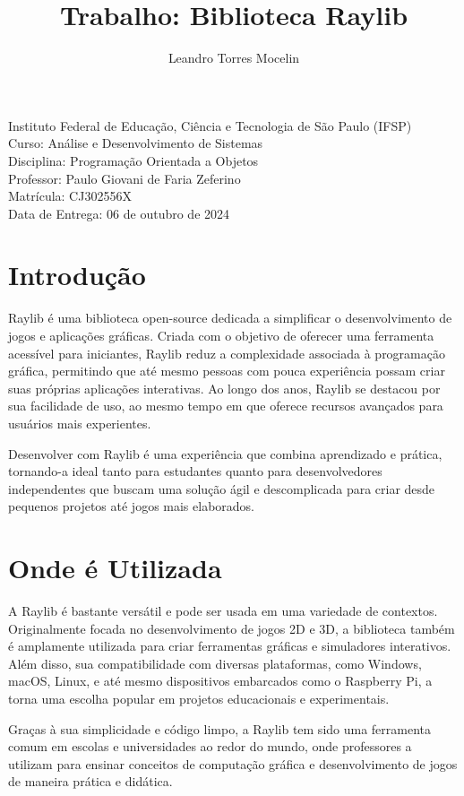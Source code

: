 \documentclass[a4paper,12pt]{article}
\title{Trabalho: Biblioteca Raylib}
\author{Leandro Torres Mocelin}
\date{}
\begin{document}
\maketitle

\begin{center}
    Instituto Federal de Educação, Ciência e Tecnologia de São Paulo (IFSP) \\
    Curso: Análise e Desenvolvimento de Sistemas \\
    Disciplina: Programação Orientada a Objetos \\
    Professor: Paulo Giovani de Faria Zeferino \\
    Matrícula: CJ302556X \\
    Data de Entrega: 06 de outubro de 2024
\end{center}

\section{Introdução}
Raylib é uma biblioteca open-source dedicada a simplificar o desenvolvimento de jogos e aplicações gráficas. Criada com o objetivo de oferecer uma ferramenta acessível para iniciantes, Raylib reduz a complexidade associada à programação gráfica, permitindo que até mesmo pessoas com pouca experiência possam criar suas próprias aplicações interativas. Ao longo dos anos, Raylib se destacou por sua facilidade de uso, ao mesmo tempo em que oferece recursos avançados para usuários mais experientes.

Desenvolver com Raylib é uma experiência que combina aprendizado e prática, tornando-a ideal tanto para estudantes quanto para desenvolvedores independentes que buscam uma solução ágil e descomplicada para criar desde pequenos projetos até jogos mais elaborados.

\section{Onde é Utilizada}
A Raylib é bastante versátil e pode ser usada em uma variedade de contextos. Originalmente focada no desenvolvimento de jogos 2D e 3D, a biblioteca também é amplamente utilizada para criar ferramentas gráficas e simuladores interativos. Além disso, sua compatibilidade com diversas plataformas, como Windows, macOS, Linux, e até mesmo dispositivos embarcados como o Raspberry Pi, a torna uma escolha popular em projetos educacionais e experimentais.

Graças à sua simplicidade e código limpo, a Raylib tem sido uma ferramenta comum em escolas e universidades ao redor do mundo, onde professores a utilizam para ensinar conceitos de computação gráfica e desenvolvimento de jogos de maneira prática e didática.
\end{document}
